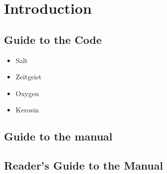 \chapter{Introduction}

\section{Guide to the Code}

\begin{itemize}
\item {Salt}
\item {Zeitgeist}
\item {Oxygen}
\item {Kerosin}
\end{itemize}

\section{Guide to the manual}

\section{Reader's Guide to the Manual}


